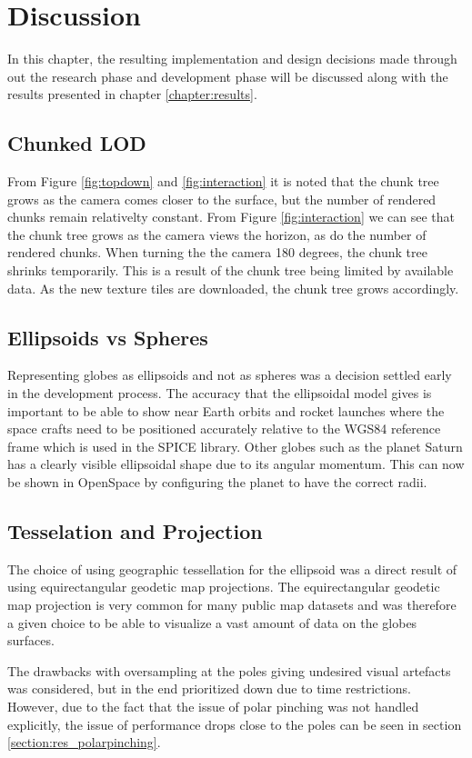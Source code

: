 \chapter{Discussion}
In this chapter, the resulting implementation and design decisions made through out the research phase and development phase will be discussed along with the results presented in chapter \ref{chapter:results}.

\section{Chunked LOD}
From Figure \ref{fig:topdown} and \ref{fig:interaction} it is noted that the chunk tree grows as the camera comes closer to the surface, but the number of rendered chunks remain relativelty constant.
From Figure \ref{fig:interaction} we can see that the chunk tree grows as the camera views the horizon, as do the number of rendered chunks. When turning the the camera 180 degrees, the chunk tree shrinks temporarily. This is a result of the chunk tree being limited by available data. As the new texture tiles are downloaded, the chunk tree grows accordingly.

\section{Ellipsoids vs Spheres}
Representing globes as ellipsoids and not as spheres was a decision settled early in the development process. 
The accuracy that the ellipsoidal model gives is important to be able to show near Earth orbits and rocket launches where the space crafts need to be positioned accurately relative to the WGS84 reference frame which is used in the SPICE library. 
Other globes such as the planet Saturn has a clearly visible ellipsoidal shape due to its angular momentum. This can now be shown in OpenSpace by configuring the planet to have the correct radii.

\section{Tesselation and Projection}
The choice of using geographic tessellation for the ellipsoid was a direct result of using equirectangular geodetic map projections. 
The equirectangular geodetic map projection is very common for many public map datasets and was therefore a given choice to be able to visualize a vast amount of data on the globes surfaces.

The drawbacks with oversampling at the poles giving undesired visual artefacts was considered, but in the end prioritized down due to time restrictions. However, due to the fact that the issue of polar pinching was not handled explicitly, the issue of performance drops close to the poles can be seen in section \ref{section:res_polarpinching}.

